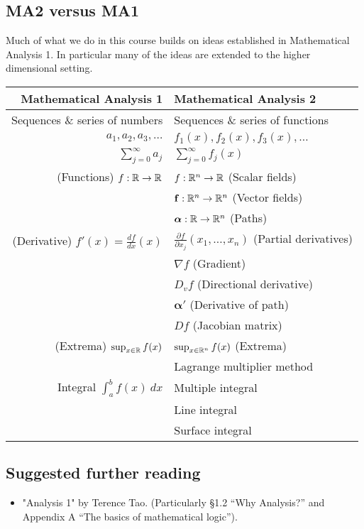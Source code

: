 \subsection*{MA2 versus MA1}

Much of what we do in this course builds on ideas established in Mathematical Analysis 1.
In particular many of the ideas are extended to the higher dimensional setting.

\begin{center}
  \begin{tabular}{r | l}
    \textbf{Mathematical Analysis 1}
     &
    \textbf{Mathematical Analysis 2}  \\
    \hline
    Sequences \& series of numbers
     &
    Sequences \& series  of functions \\
    \(a_1, a_2, a_3,\ldots \)
     &
    \(f_1(x), f_2(x), f_3(x),\ldots \)
    \\
    \(\sum_{j=0}^{\infty} a_j\)
     &
    \(\sum_{j=0}^{\infty} f_j(x)\)
    \\
    \hline
    (Functions) \(f:\mathbb{R} \to \mathbb{R}\)
     &
    \(f:\mathbb{R}^n \to \mathbb{R}\) (Scalar fields)
    \\
     &
    \(\mathbf{f}:\mathbb{R}^n \to \mathbb{R}^n\) (Vector fields)
    \\
     &
    \(\boldsymbol{\alpha}:\mathbb{R} \to \mathbb{R}^n\) (Paths)
    \\
    \hline
    (Derivative) \( f'(x) = \frac{df}{dx}(x)\)
     &
    \( \frac{\partial f}{\partial x_j}(x_1,\ldots,x_n)\) (Partial derivatives)
    \\
     &
    \(\nabla f\) (Gradient)
    \\
     &
    \(D_v f\) (Directional derivative)
    \\
     &
    \(\boldsymbol{\alpha}'\) (Derivative of path)
    \\
     &
    \(Df\) (Jacobian matrix)
    \\
    \hline
    (Extrema) \(\sup_{x\in \mathbb{R}} f(x)\)
     &
    \(\sup_{x\in \mathbb{R}^n} f(x)\) (Extrema)
    \\
     &
    Lagrange multiplier method
    \\
    \hline
    Integral \(\int_{a}^{b} f(x) \ dx\)
     &
    Multiple integral
    \\
     &
    Line integral
    \\
     &
    Surface integral
  \end{tabular}
\end{center}


\subsection*{Suggested further reading}

\begin{itemize}
  \item "Analysis 1" by Terence Tao.
        (Particularly \S 1.2 ``Why Analysis?'' and Appendix A ``The basics of mathematical logic'').
\end{itemize}